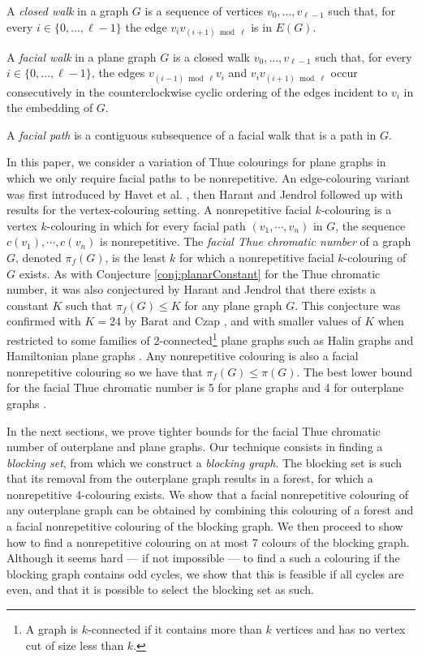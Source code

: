 \documentclass{patmorin}
\begin{document}
A \emph{closed walk} in a graph $G$ is a sequence of vertices $v_0,\ldots,v_{\ell-1}$ such that, for every $i\in\{0,\ldots,\ell-1\}$ the edge $v_iv_{(i+1)\bmod \ell}$ is in $E(G)$.

A \emph{facial walk} in a plane graph $G$ is a closed walk
$v_0,\ldots,v_{\ell-1}$ such that, for every $i\in\{0,\ldots,\ell-1\}$,
the edges $v_{(i-1)\bmod \ell} v_i$ and $v_iv_{(i+1)\bmod\ell}$ occur
consecutively in the counterclockwise cyclic ordering of the edges
incident to $v_i$ in the embedding of $G$.

A \emph{facial path} is a contiguous subsequence of a facial walk that
is a path in $G$.
 

In this paper, we consider a variation of Thue colourings for plane graphs in which we only require facial paths to be nonrepetitive. An edge-colouring variant was first introduced by Havet et al. \cite{havet2011facial}, then Harant and Jendrol \cite{harant2012nonrepetitive} followed up with results for the vertex-colouring setting. A nonrepetitive facial $k$-colouring is a vertex $k$-colouring in which for every facial path $(v_1,\cdots,v_n)$ in $G$, the sequence $c(v_1),\cdots, c(v_n)$ is nonrepetitive. The \emph{facial Thue chromatic number} of a graph $G$, denoted $\pi_f(G)$, is the least $k$ for which a nonrepetitive facial $k$-colouring of $G$ exists. As with Conjecture \ref{conj:planarConstant} for the Thue chromatic number, it was also conjectured by Harant and Jendrol \cite{harant2012nonrepetitive} that there exists a constant $K$ such that $\pi_f(G) \leq K$ for any plane graph $G$. This conjecture was confirmed with $K=24$ by Barat and Czap \cite{barat2013facial}, and with smaller values of $K$ when restricted to some families of 2-connected\footnote{A graph is $k$-connected if it contains more than $k$ vertices and has no vertex cut of size less than $k$.} plane graphs such as Halin graphs and Hamiltonian plane graphs \cite{harant2012nonrepetitive}. Any nonrepetitive colouring is also a facial nonrepetitive colouring so we have that $\pi_f(G) \leq \pi(G)$. The best lower bound for the facial Thue chromatic number is 5 for plane graphs and 4 for outerplane graphs \cite{barat2013facial}.

In the next sections, we prove tighter bounds for the facial Thue chromatic number of outerplane and plane graphs. Our technique consists in finding a \emph{blocking set}, from which we construct a \emph{blocking graph}. The blocking set is such that its removal from the outerplane graph results in a forest, for which a nonrepetitive 4-colouring exists. We show that a facial nonrepetitive colouring of any outerplane graph can be obtained by combining this colouring of a forest and a facial nonrepetitive colouring of the blocking graph.
We then proceed to show how to find a nonrepetitive colouring on at most 7 colours of the blocking graph. Although it seems hard --- if not impossible --- to find a such a colouring if the blocking graph contains odd cycles, we show that this is feasible if all cycles are even, and that it is possible to select the blocking set as such.
\end{document}
